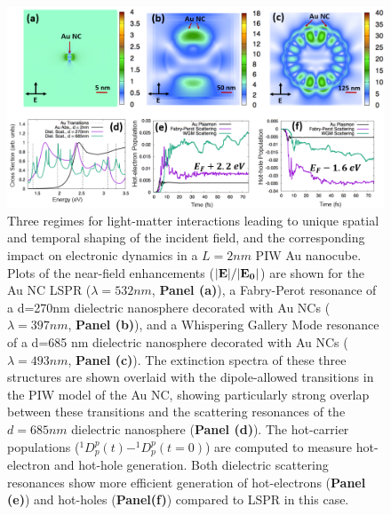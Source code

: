 \documentclass[journal=jpclcd,manuscript=article]{achemso}
\begin{document}
\begin{figure}
\begin{center}
\includegraphics[width=6in]{Au_AllThree_Revision.png}
\caption{Three regimes for light-matter interactions leading to unique
spatial and temporal shaping of the incident field, and the corresponding
impact on electronic dynamics in a $L=2nm$ PIW Au nanocube. Plots of the near-field enhancements (${\bf |E|}/{\bf |E_0|}$) are shown for the
Au NC LSPR ($\lambda=532 nm$, {\bf Panel (a)}), a Fabry-Perot resonance of a d=270nm dielectric nanosphere decorated with Au NCs ($\lambda = 397 nm$, {\bf Panel (b)}),
and a Whispering Gallery Mode resonance of a d=685 nm dielectric nanosphere decorated with Au NCs ($\lambda = 493 nm$, {\bf Panel (c)}).
The extinction spectra of these three structures are shown overlaid with the dipole-allowed transitions in the PIW model of the Au NC, showing particularly
strong overlap between these transitions and the scattering resonances of the $d=685 nm$ dielectric nanosphere ({\bf Panel (d)}).
The hot-carrier populations ($^1D_p^p(t)-^1D_p^p(t=0)$) are computed to measure hot-electron and hot-hole generation.
Both dielectric scattering resonances show more efficient generation of hot-electrons ({\bf Panel (e)}) and hot-holes ({\bf Panel(f)}) compared to LSPR in this case.}
\end{center}
\end{figure}
\end{document}
